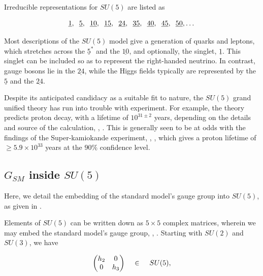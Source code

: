 \documentclass[letterpaper,12pt,titlepage,oneside,final]{book}
\begin{document}
Irreducible representations for $SU(5)$ are listed as 

$$\underline{1}, \hspace{2mm} \underline{5}, \hspace{2mm} \underline{10}, \hspace{2mm} \underline{15}, \hspace{2mm} \underline{24}, \hspace{2mm}  \underline{35}, \hspace{2mm} \underline{40}, \hspace{2mm} \underline{45},\hspace{2mm} \underline{50},  \dots
$$

\noindent Most descriptions of the $SU(5)$ model give a generation of quarks and leptons, which stretches across the $\underline{5}^*$ and the $\underline{10}$, and optionally, the singlet, $\underline{1}$.  This singlet can be included so as to represent the right-handed neutrino.  In contrast, gauge bosons lie in the $\underline{24}$, while the Higgs fields typically are represented by the $\underline{5}$ and the $\underline{24}$.

Despite its anticipated candidacy as a suitable fit to nature, the $SU(5)$ grand unified theory has run into trouble with  experiment.  For example, the theory predicts proton decay, with a lifetime of  $10^{31\pm2}$ years, depending on the details and source of the calculation, \cite{Mann}, \cite{Lang}.    This is generally seen to be at odds with the findings of the Super-kamiokande experiment, \cite{skk1}, \cite{skk2}, which gives a proton lifetime of $\geq5.9\times10^{33}$ years at the $90\%$ confidence level.



\subsection{$G_{SM}$ inside  $SU(5)$  }


Here, we detail the embedding of the standard model's gauge group into $SU(5)$, as given in \cite{agut}.

Elements of $SU(5)$ can be written down as $5\times5$ complex matrices, wherein we may embed the standard model's gauge group, \cite{agut}, \cite{Lang}.  Starting with $SU(2)$ and $SU(3)$, we have

\begin{equation}
\left( \begin{matrix}h_2&0\\0&h_3 \end{matrix}  \right) \hspace{4mm} \in \hspace{4mm} SU(5),
\end{equation}
\end{document}
